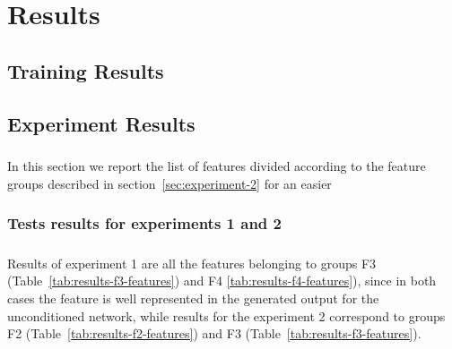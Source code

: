 \chapter{Results}
\label{sec:results}
\section{Training Results}

\section{Experiment Results}
\paragraph{} In this section we report the list of features divided according to the feature groups described in section~\ref{sec:experiment-2} for an easier 
\subsection{Tests results for experiments 1 and 2}
\paragraph{} Results of experiment 1 are all the features belonging to groups F3 (Table~\ref{tab:results-f3-features}) and F4 \ref{tab:results-f4-features}), since in both cases the feature is well represented in the generated output for the unconditioned network, while results for the experiment 2 correspond to groups F2 (Table~\ref{tab:results-f2-features}) and F3 (Table~\ref{tab:results-f3-features}).


